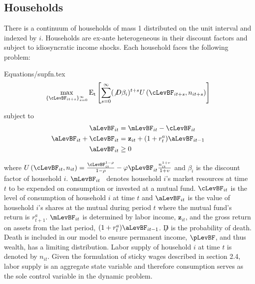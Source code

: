 \documentclass[titlepage]{\econtex}\providecommand{\texname}{BufferStockTheory}
\providecommand{\EqDir}{Equations}
\begin{document}
\subsection{Households}
\label{subsec:Households} 

There is a continuum of households of mass 1 distributed on the unit
interval and indexed by $i$. Households are ex-ante heterogeneous in their discount factors and subject to idiosyncratic income shocks.  Each household faces the following problem:

\begin{verbatimwrite}{\EqDir/supfn.tex}
\begin{eqnarray}
  \label{eq:supfn}
  \max_{\{\cLevBF_{it+s}\}_{s=0}^{\infty}} \mathrm{E_{t}}\left[\sum_{s=0}^{\infty} (\not D \beta_{i})^{t+s} U\left(  \cLevBF_{i t+s}, n_{i t+s}\right)\right]
\end{eqnarray}
\end{verbatimwrite}
 

subject to 
\begin{align*}
\aLevBF_{it}     &= \mLevBF_{it} - \cLevBF_{it}   \label{eq:DBCparts} \\
\aLevBF_{it} +\cLevBF_{it}    &= \mathbf{z}_{it} +   (1 + r^{a}_{t} ) \aLevBF_{it-1}   \\ 
\aLevBF_{it}  &\geq 0 \\
\end{align*}

where
$U\left(\cLevBF_{i t}, n_{i t}\right) = \frac{\cLevBF_{i t}^{1-\rho}}{1 -\rho} - \varphi \pLevBF_{it} \frac{n_{it}^{1+v}}{1+v}$  and $\beta_{i}$ is the discount factor of household $i$. $\mLevBF_{it}$ \ denotes household $i$'s market resources at time $t$ to be expended on consumption or invested at a mutual fund. $\cLevBF_{it}$ is the level of consumption of household $i$ at time $t$ and  $ \aLevBF_{it}$ is the value of household $i$'s shares at the mutual during period $t$ where the mutual fund's return is $r_{t+1}^{a}$.  $\mLevBF_{it}$ is determined by labor income,  $\mathbf{z}_{it}$, and the gross return on assets from the last period, $(1+r_{t}^{a}) \aLevBF_{it-1} $. $\not D$ is the probability of death. Death is included in our model to ensure permanent income, $\pLevBF$, and thus wealth, has a limiting distribution.   Labor supply of household $i$ at time $t$ is denoted by $n_{it}$.  Given the formulation of sticky wages described in section 2.4, labor supply is an aggregate state variable and therefore consumption serves as the sole control variable in the dynamic problem.  \\
\end{document}
